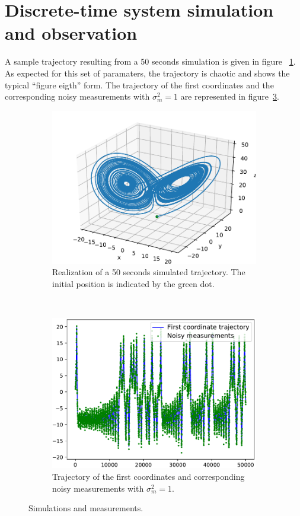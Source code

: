 \documentclass[english, DIV=13]{scrartcl}
\begin{document}
\section{Discrete-time system simulation and observation}
A sample trajectory resulting from a 50 seconds simulation is given in figure~
\ref{fig:q2-3d-trajectory}. As expected for this set of paramaters, the trajectory
is chaotic and shows the typical ``figure eigth'' form. 
The trajectory of the first coordinates and the corresponding noisy measurements
with $\sigma^2_m = 1$ are represented in figure~\ref{fig:q2-mes-vs-real}.
\begin{figure}[hb]
    \centering
    \begin{subfigure}{0.49\textwidth}
        \includegraphics[width=\textwidth]{figures/q2-3d-trajectory}
        \caption{Realization of a 50 seconds simulated trajectory. The initial
        position is indicated by the green dot.}
        \label{fig:q2-3d-trajectory}
    \end{subfigure}%
    ~
    \begin{subfigure}{0.49\textwidth}
        \includegraphics[width=\textwidth]{figures/q2-mes-vs-real}
        \caption{Trajectory of the first coordinates and corresponding noisy
        measurements with $\sigma^2_m = 1$.}
        \label{fig:q2-mes-vs-real}
    \end{subfigure}
    \caption{Simulations and measurements.}
\end{figure}
\end{document}
